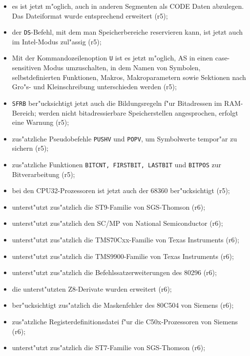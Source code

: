 \documentclass[12pt,a4paper,twoside]{report}
\newcommand{\tty}[1]{{\tt #1}}
\begin{document}
\begin{itemize}
{\begin{itemize}
{                 Gro"s- in Kleinbuchstaben umzuwandeln (r5);}
      \item{es ist jetzt m"oglich, auch in anderen Segmenten als
            CODE Daten abzulegen.  Das Dateiformat wurde entsprechend
            erweitert (r5);}
      \item{der \tty{DS}-Befehl, mit dem man Speicherbereiche reservieren
            kann, ist jetzt auch im Intel-Modus zul"assig (r5);}
      \item{Mit der Kommandozeilenoption \tty{U} ist es jetzt
            m"oglich, AS in einen case-sensitiven Modus umzuschalten,
            in dem Namen von Symbolen, selbstdefinierten Funktionen,
            Makros, Makroparametern sowie Sektionen nach Gro"s-
            und Kleinschreibung unterschieden werden (r5);}
      \item{\tty{SFRB} ber"ucksichtigt jetzt auch die Bildungsregeln
            f"ur Bitadressen im RAM-Bereich; werden nicht bitadressierbare
            Speicherstellen angesprochen, erfolgt eine Warnung (r5);}
      \item{zus"atzliche Pseudobefehle \tty{PUSHV} und \tty{POPV}, um
            Symbolwerte tempor"ar zu sichern (r5);}
      \item{zus"atzliche Funktionen \tty{BITCNT, FIRSTBIT, LASTBIT} und
                 \tty{BITPOS} zur Bitverarbeitung (r5);}
      \item{bei den CPU32-Prozessoren ist jetzt auch der 68360
            ber"ucksichtigt (r5);}
      \item{unterst"utzt zus"atzlich die ST9-Familie von SGS-Thomson (r6);}
      \item{unterst"utzt zus"atzlich den SC/MP von National Semiconductor
            (r6);}
      \item{unterst"utzt zus"atzlich die TMS70Cxx-Familie von Texas
            Instruments (r6);}
      \item{unterst"utzt zus"atzlich die TMS9900-Familie von Texas
            Instruments (r6);}
      \item{unterst"utzt zus"atzlich die Befehlssatzerweiterungen
            des 80296 (r6);}
      \item{die unterst"utzten Z8-Derivate wurden erweitert
            (r6);}
      \item{ber"ucksichtigt zus"atzlich die Maskenfehler des 80C504
            von Siemens (r6);}
      \item{zus"atzliche Registerdefinitionsdatei f"ur die C50x-Prozessoren
            von Siemens (r6);}
      \item{unterst"utzt zus"atzlich die ST7-Familie von SGS-Thomson (r6);}

\end{itemize}}
\end{itemize}
\end{document}
